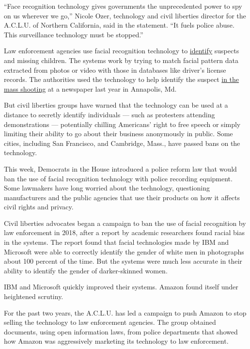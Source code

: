 ``Face recognition technology gives governments the unprecedented power
to spy on us wherever we go,'' Nicole Ozer, technology and civil
liberties director for the A.C.L.U. of Northern California, said in the
statement. ``It fuels police abuse. This surveillance technology must be
stopped.''

Law enforcement agencies use facial recognition technology to
\href{https://www.nytimes3xbfgragh.onion/2019/06/09/opinion/facial-recognition-police-new-york-city.html}{identify}
suspects and missing children. The systems work by trying to match
facial pattern data extracted from photos or video with those in
databases like driver's license records. The authorities used the
technology to help identify the suspect
\href{https://www.nytimes3xbfgragh.onion/2019/04/29/us/capital-gazette-shooting-suspect.html}{in
the mass shooting} at a newspaper last year in Annapolis, Md.

But civil liberties groups have warned that the technology can be used
at a distance to secretly identify individuals --- such as protesters
attending demonstrations --- potentially chilling Americans' right to
free speech or simply limiting their ability to go about their business
anonymously in public. Some cities, including San Francisco, and
Cambridge, Mass., have passed bans on the technology.

This week, Democrats in the House introduced a police reform law that
would ban the use of facial recognition technology with police recording
equipment. Some lawmakers have long worried about the technology,
questioning manufacturers and the public agencies that use their
products on how it affects civil rights and privacy.

Civil liberties advocates began a campaign to ban the use of facial
recognition by law enforcement in 2018, after a report by academic
researchers found racial bias in the systems. The report found that
facial technologies made by IBM and Microsoft were able to correctly
identify the gender of white men in photographs about 100 percent of the
time. But the systems were much less accurate in their ability to
identify the gender of darker-skinned women.

IBM and Microsoft quickly improved their systems. Amazon found itself
under heightened scrutiny.

For the past two years, the A.C.L.U. has led a campaign to push Amazon
to stop selling the technology to law enforcement agencies. The group
obtained documents, using open information laws, from police departments
that showed how Amazon was aggressively marketing its technology to law
enforcement.

